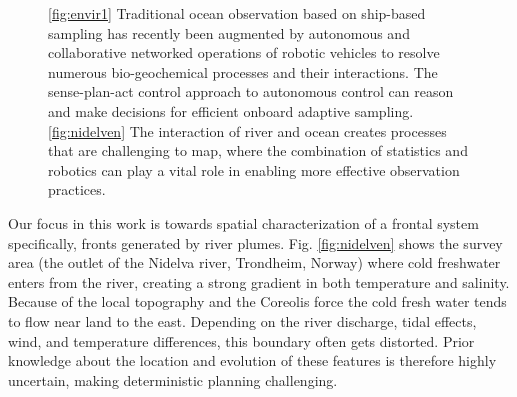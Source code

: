 \documentclass[aoas]{imsart}
\begin{document}
\begin{figure}[!h] 
  \centering 
  \hfill
  \caption{\ref{fig:envir1} Traditional ocean observation based on
    ship-based sampling has recently been augmented by autonomous and
    collaborative networked operations of robotic vehicles to resolve
    numerous bio-geochemical processes and their interactions. The
    sense-plan-act control approach to autonomous control can reason
    and make decisions for efficient onboard adaptive sampling.
    \ref{fig:nidelven} The interaction of river and ocean creates
    processes that are challenging to map, where the combination of
    statistics and robotics can play a vital role in enabling more
    effective observation practices.}
\label{fig:envir}
\end{figure}

Our focus in this work is towards spatial characterization of a
frontal system specifically, fronts generated by river
plumes. Fig. \ref{fig:nidelven} shows the survey area (the outlet of
the Nidelva river, Trondheim, Norway) where cold freshwater enters
from the river, creating a strong gradient in both temperature and
salinity. Because of the local topography and the Coreolis force
\citep{coriolis1835memoire} the cold fresh water tends to flow near
land to the east. Depending on the river discharge, tidal effects,
wind, and temperature differences, this boundary often gets
distorted. Prior knowledge about the location and evolution of these
features is therefore highly uncertain, making deterministic planning
challenging.
\end{document}
